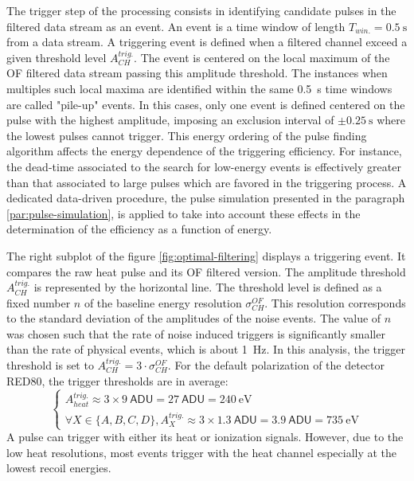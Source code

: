 The trigger step of the processing consists in identifying candidate pulses in the filtered data stream as an event. An event is a time window of length $T_{win.} = \SI{0.5}{\s}$ from a data stream. A triggering event is defined when a filtered channel exceed a given threshold level $A_{CH}^{trig.}$. The event is centered on the local maximum of the OF filtered data stream passing this amplitude threshold. The instances when multiples such local maxima are identified within the same \SI{0.5}{\s} time windows are called "pile-up" events. In this cases, only one event is defined centered on the pulse with the highest amplitude, imposing an exclusion interval of $\pm\SI{0.25}{\s}$ where the lowest pulses cannot trigger.
This energy ordering of the pulse finding algorithm affects the energy dependence of the triggering efficiency. For instance, the dead-time associated to the search
for low-energy events is effectively greater than that associated to large pulses which are favored in the triggering process. A dedicated data-driven procedure, the pulse simulation presented in the paragraph \ref{par:pulse-simulation}, is applied to take into account these effects in the determination of the efficiency as a function of energy. 

The right subplot of the figure \ref{fig:optimal-filtering} displays a triggering event. It compares the raw heat pulse and its OF filtered version. The amplitude threshold $A_{CH}^{trig.}$ is represented by the horizontal line. The threshold level is defined as a fixed number $n$ of the baseline energy resolution $\sigma_{CH}^{OF}$. This resolution corresponds to the standard deviation of the amplitudes of the noise events.
The value of $n$ was chosen such that the rate of noise induced triggers is significantly smaller than the rate of physical events, which is about \SI{1}{\Hz}. In this analysis, the trigger threshold is set to $A_{CH}^{trig.} = 3 \cdot \sigma_{CH}^{OF}$. For the default polarization of the detector RED80, the trigger thresholds are in average:
\begin{equation}
\begin{cases}
A_{heat}^{trig.} \approx 3 \times \SI{9}{\textsf{ADU}} = \SI{27}{\textsf{ADU}} = \SI{240}{\eV} \\
\forall X \in \{A,B,C,D \}, 
A_{X}^{trig.} \approx 3 \times \SI{1.3}{\textsf{ADU}} = \SI{3.9}{\textsf{ADU}} = \SI{735}{\eV}
\end{cases}
\end{equation}
A pulse can trigger with either its heat or ionization signals. However, due to the low heat resolutions, most events trigger with the heat channel especially at the lowest recoil energies.



